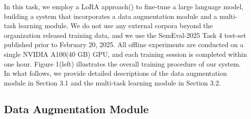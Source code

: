 \documentclass[11pt]{article}
\begin{document}


In this task, we employ a LoRA approach(\citet{hu2022lora}) to fine-tune a large language model, building a system that incorporates a data augmentation module and a multi-task learning module. 
We do not use any external corpora beyond the organization released training data, and we use the SemEval-2025 Task 4 test-set published prior to February 20, 2025. 
All offline experiments are conducted on a single NVIDIA A100(40 GB) GPU, and each training session is completed within one hour. 
Figure 1(left) illustrates the overall training procedure of our system. In what follows, we provide detailed descriptions of the data augmentation module in Section 3.1 and the multi-task learning module in Section 3.2.

\subsection{Data Augmentation Module} 
\end{document}
